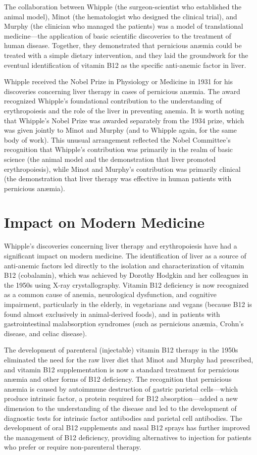 The collaboration between Whipple (the surgeon-scientist who established the animal model), Minot (the hematologist who designed the clinical trial), and Murphy (the clinician who managed the patients) was a model of translational medicine---the application of basic scientific discoveries to the treatment of human disease. Together, they demonstrated that pernicious an{\ae}mia could be treated with a simple dietary intervention, and they laid the groundwork for the eventual identification of vitamin B12 as the specific anti-anemic factor in liver.

Whipple received the Nobel Prize in Physiology or Medicine in 1931 for his discoveries concerning liver therapy in cases of pernicious an{\ae}mia. The award recognized Whipple's foundational contribution to the understanding of erythropoiesis and the role of the liver in preventing anemia. It is worth noting that Whipple's Nobel Prize was awarded separately from the 1934 prize, which was given jointly to Minot and Murphy (and to Whipple again, for the same body of work). This unusual arrangement reflected the Nobel Committee's recognition that Whipple's contribution was primarily in the realm of basic science (the animal model and the demonstration that liver promoted erythropoiesis), while Minot and Murphy's contribution was primarily clinical (the demonstration that liver therapy was effective in human patients with pernicious an{\ae}mia).

\section{Impact on Modern Medicine}

Whipple's discoveries concerning liver therapy and erythropoiesis have had a significant impact on modern medicine. The identification of liver as a source of anti-anemic factors led directly to the isolation and characterization of vitamin B12 (cobalamin), which was achieved by Dorothy Hodgkin and her colleagues in the 1950s using X-ray crystallography. Vitamin B12 deficiency is now recognized as a common cause of anemia, neurological dysfunction, and cognitive impairment, particularly in the elderly, in vegetarians and vegans (because B12 is found almost exclusively in animal-derived foods), and in patients with gastrointestinal malabsorption syndromes (such as pernicious an{\ae}mia, Crohn's disease, and celiac disease).

The development of parenteral (injectable) vitamin B12 therapy in the 1950s eliminated the need for the raw liver diet that Minot and Murphy had prescribed, and vitamin B12 supplementation is now a standard treatment for pernicious an{\ae}mia and other forms of B12 deficiency. The recognition that pernicious an{\ae}mia is caused by autoimmune destruction of gastric parietal cells---which produce intrinsic factor, a protein required for B12 absorption---added a new dimension to the understanding of the disease and led to the development of diagnostic tests for intrinsic factor antibodies and parietal cell antibodies. The development of oral B12 supplements and nasal B12 sprays has further improved the management of B12 deficiency, providing alternatives to injection for patients who prefer or require non-parenteral therapy.

